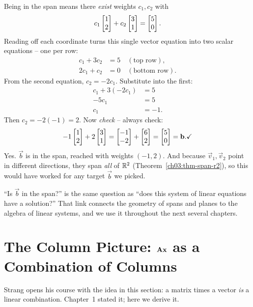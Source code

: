 Being in the span means there \emph{exist} weights $c_1, c_2$ with
\[
  c_1\begin{bmatrix}1\\2\end{bmatrix} + c_2\begin{bmatrix}3\\1\end{bmatrix} = \begin{bmatrix}5\\0\end{bmatrix}.
\]
Reading off each coordinate turns this single vector equation into two scalar equations -- one per row:
\[
  \begin{aligned}
    c_1 + 3c_2 &= 5 \quad (\text{top row}),\\
    2c_1 + c_2 &= 0 \quad (\text{bottom row}).
  \end{aligned}
\]
From the second equation, $c_2 = -2c_1$. Substitute into the first:
\begin{align*}
  c_1 + 3(-2c_1) &= 5\\
  -5c_1 &= 5\\
  c_1 &= -1.
\end{align*}
Then $c_2 = -2(-1) = 2$. Now \emph{check} -- always check:
\[
  -1\begin{bmatrix}1\\2\end{bmatrix} + 2\begin{bmatrix}3\\1\end{bmatrix}
  = \begin{bmatrix}-1\\-2\end{bmatrix} + \begin{bmatrix}6\\2\end{bmatrix}
  = \begin{bmatrix}5\\0\end{bmatrix} = \mathbf{b}. \checkmark
\]
Yes. $\vec{b}$ is in the span, reached with weights $(-1, 2)$. And because $\vec{v}_1, \vec{v}_2$ point in different directions, they span \emph{all} of $\mathbb{R}^2$ (Theorem~\ref{ch03:thm-span-r2}), so this would have worked for any target $\vec{b}$ we picked.

\begin{focusbox}
``Is $\vec{b}$ in the span?'' is the same question as ``does this system of linear equations have a solution?'' That link connects the geometry of spans and planes to the algebra of linear systems, and we use it throughout the next several chapters.
\end{focusbox}

\section{The Column Picture: $\mathbf{A}\mathbf{x}$ as a Combination of Columns}

Strang opens his course with the idea in this section: a matrix times a vector \emph{is} a linear combination. Chapter~1 stated it; here we derive it.

